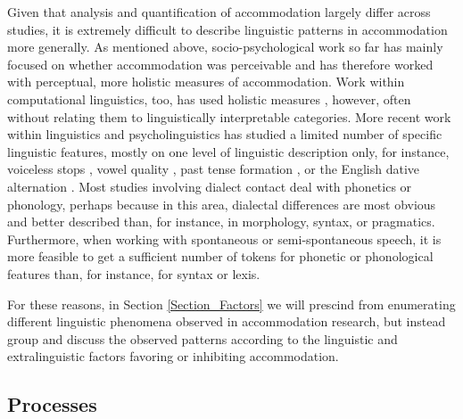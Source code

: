 \documentclass[output=paper,
modfonts
]{langscibook}
\begin{document}
Given that analysis and quantification of accommodation largely differ across studies, it is extremely difficult to describe linguistic patterns in accommodation more generally. As mentioned above, socio-psychological work so far has mainly focused on whether accommodation was perceivable and has therefore worked with perceptual, more holistic measures of accommodation. Work within computational linguistics, too, has used holistic measures \citep{lewandowski_talent_2012,de_looze_investigating_2014}, however, often without relating them to linguistically interpretable categories. More recent work within linguistics and psycholinguistics has studied a limited number of specific linguistic features, mostly on one level of linguistic description only, for instance, voiceless stops \citep{nielsen_specificity_2011}, vowel quality \citep{babel_dialect_2010}, past tense formation \citep{beckner_participants_2016}, or the English dative alternation \citep{weatherholtz_socially-mediated_2014}. Most studies involving dialect contact deal with phonetics or phonology, perhaps because in this area, dialectal differences are most obvious and better described than, for instance, in morphology, syntax, or pragmatics. Furthermore, when working with spontaneous or semi-spontaneous speech, it is more feasible to get a sufficient number of tokens for phonetic or phonological features than, for instance, for syntax or lexis.
% 
% 

For these reasons, in Section \ref{Section_Factors} we will prescind from enumerating different linguistic phenomena observed in accommodation research, but instead group and discuss the observed patterns according to the linguistic and extralinguistic factors favoring or inhibiting accommodation.

\subsection{Processes}
\end{document}
